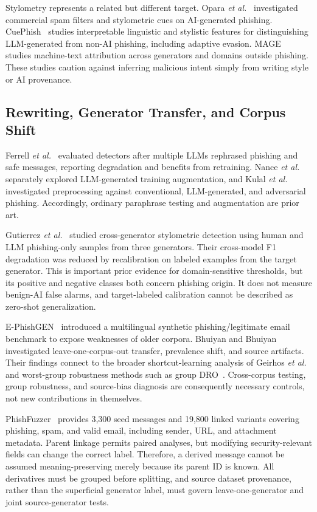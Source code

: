 Stylometry represents a related but different target. Opara \emph{et al.}~\cite{opara2025stylometry} investigated commercial spam filters and stylometric cues on AI-generated phishing. CuePhish~\cite{commey2026cuephish} studies interpretable linguistic and stylistic features for distinguishing LLM-generated from non-AI phishing, including adaptive evasion. MAGE~\cite{li2024mage} studies machine-text attribution across generators and domains outside phishing. These studies caution against inferring malicious intent simply from writing style or AI provenance.

\subsection{Rewriting, Generator Transfer, and Corpus Shift}
Ferrell \emph{et al.}~\cite{ferrell2025rephrasing} evaluated detectors after multiple LLMs rephrased phishing and safe messages, reporting degradation and benefits from retraining. Nance \emph{et al.}~\cite{nance2025augmentation} separately explored LLM-generated training augmentation, and Kulal \emph{et al.}~\cite{kulal2025robust} investigated preprocessing against conventional, LLM-generated, and adversarial phishing. Accordingly, ordinary paraphrase testing and augmentation are prior art.

Gutierrez \emph{et al.}~\cite{gutierrez2026crossmodel} studied cross-generator stylometric detection using human and LLM phishing-only samples from three generators. Their cross-model F1 degradation was reduced by recalibration on labeled examples from the target generator. This is important prior evidence for domain-sensitive thresholds, but its positive and negative classes both concern phishing origin. It does not measure benign-AI false alarms, and target-labeled calibration cannot be described as zero-shot generalization.

E-PhishGEN~\cite{pajola2025ephishgen} introduced a multilingual synthetic phishing/legitimate email benchmark to expose weaknesses of older corpora. Bhuiyan and Bhuiyan~\cite{bhuiyan2026fragility} investigated leave-one-corpus-out transfer, prevalence shift, and source artifacts. Their findings connect to the broader shortcut-learning analysis of Geirhos \emph{et al.}~\cite{geirhos2020shortcut} and worst-group robustness methods such as group DRO~\cite{sagawa2020groupdro}. Cross-corpus testing, group robustness, and source-bias diagnosis are consequently necessary controls, not new contributions in themselves.

PhishFuzzer~\cite{toth2026phishfuzzer} provides 3,300 seed messages and 19,800 linked variants covering phishing, spam, and valid email, including sender, URL, and attachment metadata. Parent linkage permits paired analyses, but modifying security-relevant fields can change the correct label. Therefore, a derived message cannot be assumed meaning-preserving merely because its parent ID is known. All derivatives must be grouped before splitting, and source dataset provenance, rather than the superficial generator label, must govern leave-one-generator and joint source-generator tests.

